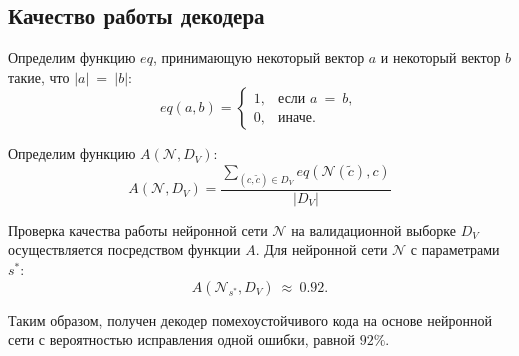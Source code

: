 \subsection{Качество работы декодера}\label{subsec:accuracy}

Определим функцию $eq$, принимающую некоторый вектор $a$ и некоторый вектор $b$ такие, что $|a|~=~|b|$:
\begin{equation}\label{eq:equal}
    eq(a, b) =
    \begin{cases}
        1, & \mbox{если } a~=~b, \\
        0, & \mbox{иначе}.
    \end{cases}
\end{equation}

Определим функцию $A(\mathcal{N}, D_V)$:
\begin{equation}\label{eq:accuracy}
    A(\mathcal{N}, D_V) = \frac{\sum\limits_{(c, \widetilde{c})\in D_V}eq(\mathcal{N}(\widetilde{c}), c)}{|D_V|}
\end{equation}

Проверка качества работы нейронной сети $\mathcal{N}$ на валидационной выборке $D_V$ осуществляется посредством функции $A$. Для нейронной сети $\mathcal{N}$ с параметрами $s^*$:
\begin{equation}\label{eq:final_accuracy}
  A(\mathcal{N}_{s^*}, D_V)~\approx~0.92.
\end{equation}

Таким образом, получен декодер помехоустойчивого кода на основе нейронной сети с вероятностью исправления одной ошибки, равной $92 \%$.

\newpage 